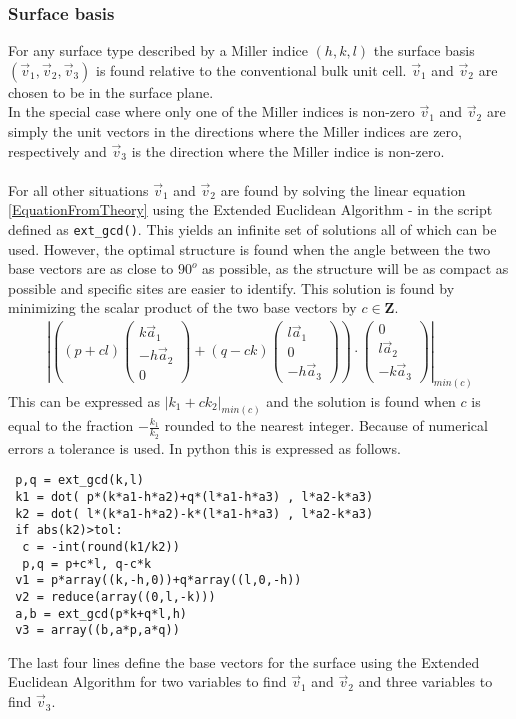 \documentclass[11pt]{article} %
\begin{document}
\subsubsection{Surface basis}\begin{small}                             \end{small}
For any surface type described by a Miller indice $(h,k,l)$ the surface basis $(\vec{v}_1,\vec{v}_2,\vec{v}_3)$ is found relative to the conventional bulk unit cell. $\vec{v}_1$ and $\vec{v}_2$ are chosen to be in the surface plane.\\
In the special case where only one of the Miller indices is non-zero $\vec{v}_1$ and $\vec{v}_2$ are simply the unit vectors in the directions where the Miller indices are zero, respectively and $\vec{v}_3$ is the direction where the Miller indice is non-zero.\\\\
For all other situations $\vec{v}_1$ and $\vec{v}_2$ are found by solving the linear equation \ref{EquationFromTheory} using the Extended Euclidean Algorithm - in the script defined as \verb#ext_gcd()#.
This yields an infinite set of solutions all of which can be used. However, the optimal structure is found when the angle between the two base vectors are as close to $90^o$ as possible, as the structure will be as compact as possible and specific sites are easier to identify. This solution is found by minimizing the scalar product of the two base vectors by $c \in \textbf{Z}$.
\begin{eqnarray}
\left|\left(\left(p+cl\right)\left(\begin{array}{c} k\vec{a}_1 \\ -h\vec{a}_2\\0\end{array}\right)
+\left(q-ck\right)\left(\begin{array}{c} l\vec{a}_1 \\ 0\\-h\vec{a}_3\end{array}\right)\right)
\cdot\left(\begin{array}{c} 0 \\ l\vec{a}_2\\-k\vec{a}_3\end{array}\right)\right|_{min(c)} \nonumber 
\end{eqnarray}
This can be expressed as $\left| k_1+ck_2 \right|_{min(c)}$ and the solution is found when $c$ is equal to the fraction $-\frac{k_1}{k_2}$ rounded to the nearest integer. Because of numerical errors a tolerance is used. In python this is expressed as follows.
\begin{verbatim}
 p,q = ext_gcd(k,l)
 k1 = dot( p*(k*a1-h*a2)+q*(l*a1-h*a3) , l*a2-k*a3)
 k2 = dot( l*(k*a1-h*a2)-k*(l*a1-h*a3) , l*a2-k*a3)
 if abs(k2)>tol:
  c = -int(round(k1/k2))
  p,q = p+c*l, q-c*k
 v1 = p*array((k,-h,0))+q*array((l,0,-h))
 v2 = reduce(array((0,l,-k)))
 a,b = ext_gcd(p*k+q*l,h)
 v3 = array((b,a*p,a*q))
\end{verbatim}
The last four lines define the base vectors for the surface using the Extended Euclidean Algorithm for two variables to find $\vec{v}_1$ and $\vec{v}_2$ and three variables to find $\vec{v}_3$. 
\end{document}
